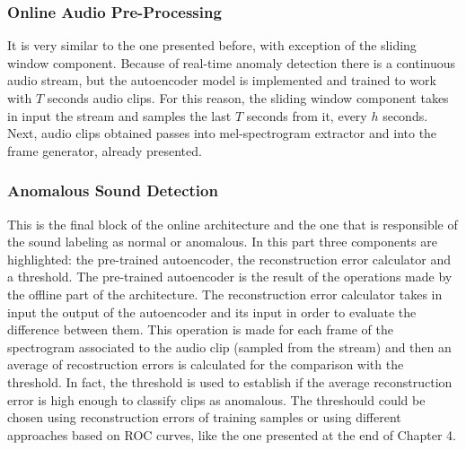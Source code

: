 \subsubsection{Online Audio Pre-Processing}
It is very similar to the one presented before, with exception of the sliding window component. Because of real-time anomaly detection there is a continuous audio stream, but the autoencoder model is implemented and trained to work with $T$ seconds audio clips. For this reason, the sliding window component takes in input the stream and samples the last $T$ seconds from it, every $h$ seconds. Next, audio clips obtained passes into mel-spectrogram extractor and into the frame generator, already presented. 
\subsubsection{Anomalous Sound Detection}
This is the final block of the online architecture and the one that is responsible of the sound labeling as normal or anomalous. In this part three components are highlighted: the pre-trained autoencoder, the reconstruction error calculator and a threshold. The pre-trained autoencoder is the result of the operations made by the offline part of the architecture. The reconstruction error calculator takes in input the output of the autoencoder and its input in order to evaluate the difference between them. This operation is made for each frame of the spectrogram associated to the audio clip (sampled from the stream) and then an average of recostruction errors is calculated for the comparison with the threshold. In fact, the threshold is used to establish if the average reconstruction error is high enough to classify clips as anomalous. The threshould could be chosen using reconstruction errors of training samples or using different approaches based on ROC curves, like the one presented at the end of Chapter 4.
